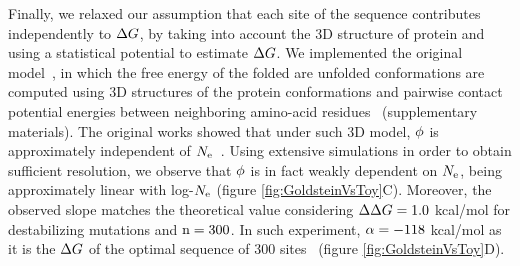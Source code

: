 Finally, we relaxed our assumption that each site of the sequence contributes independently to $\Delta G$, by taking into account the $3$D structure of protein and using a statistical potential to estimate $\Delta G$.
We implemented the original model~\citep{Williams2006, Goldstein2011, Pollock2012}, in which the free energy of the folded are unfolded conformations are computed using $3$D structures of the protein conformations and pairwise contact potential energies between neighboring amino-acid residues~\citep{Miyazawa1985} (supplementary materials).
The original works showed that under such $3$D model, $\phi$ is approximately independent of $N_{\mathrm{e}}$~\citep{Goldstein2013}.
Using extensive simulations in order to obtain sufficient resolution, we observe that $\phi$ is in fact weakly dependent on $N_{\mathrm{e}}$, being approximately linear with log-$N_{\mathrm{e}}$ (figure \ref{fig:GoldsteinVsToy}C).
Moreover, the observed slope matches the theoretical value considering $\Delta \Delta G = 1.0$ kcal/mol for destabilizing mutations and $\text{n}=300$.
In such experiment, $\alpha=-118$ kcal/mol as it is the $\Delta G$ of the optimal sequence of $300$ sites~\citep{Goldstein2011} (figure \ref{fig:GoldsteinVsToy}D).
